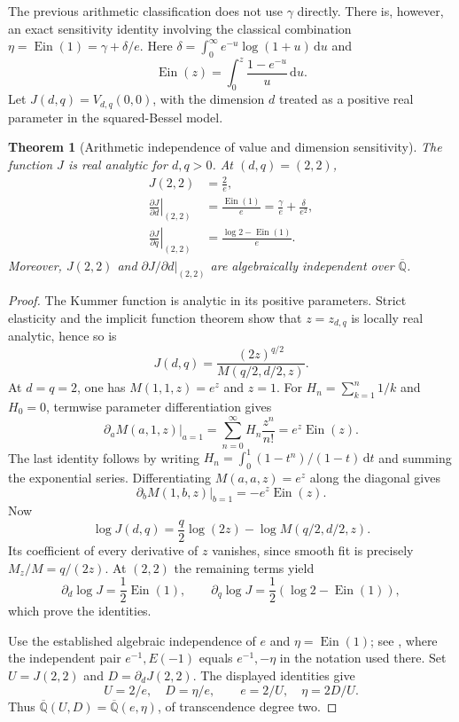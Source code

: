 \documentclass[11pt,a4paper]{article}
\newtheorem{theorem}{Theorem}[section]
\theoremstyle{definition}
\theoremstyle{remark}
\numberwithin{equation}{section}
\begin{document}
The previous arithmetic classification does not use $\gamma$ directly.
There is, however, an exact sensitivity identity involving the classical
combination $\eta=\operatorname{Ein}(1)=\gamma+\delta/e$.
Here $\delta=\int_0^\infty e^{-u}\log(1+u)\,\mathrm du$ and
\[
 \operatorname{Ein}(z)=\int_0^z\frac{1-e^{-u}}{u}\,\mathrm du.
\]
Let $J(d,q)=V_{d,q}(0,0)$, with the dimension $d$ treated as a positive
real parameter in the squared-Bessel model.

\begin{theorem}[Arithmetic independence of value and dimension sensitivity]
\label{p1:thm:value-dimension-sensitivity}
The function $J$ is real analytic for $d,q>0$. At $(d,q)=(2,2)$,
\begin{align*}
 J(2,2)&=\frac2e,\\
 \left.\frac{\partial J}{\partial d}\right|_{(2,2)}
 &=\frac{\operatorname{Ein}(1)}e
   =\frac\gamma e+\frac\delta{e^2},\\
 \left.\frac{\partial J}{\partial q}\right|_{(2,2)}
 &=\frac{\log2-\operatorname{Ein}(1)}e.
\end{align*}
Moreover, $J(2,2)$ and
$\left.\partial J/\partial d\right|_{(2,2)}$ are algebraically independent
over $\overline{\mathbb Q}$.
\end{theorem}
\begin{proof}
The Kummer function is analytic in its positive parameters. Strict
elasticity and the implicit function theorem show that $z=z_{d,q}$
is locally real analytic, hence so is
\[
 J(d,q)=\frac{(2z)^{q/2}}{M(q/2,d/2,z)}.
\]
At $d=q=2$, one has $M(1,1,z)=e^z$ and $z=1$.
For $H_n=\sum_{k=1}^n1/k$ and $H_0=0$, termwise parameter
differentiation gives
\[
 \left.\partial_aM(a,1,z)\right|_{a=1}
 =\sum_{n=0}^\infty H_n\frac{z^n}{n!}
 =e^z\operatorname{Ein}(z).
\]
The last identity follows by writing
$H_n=\int_0^1(1-t^n)/(1-t)\,\mathrm dt$ and summing the exponential
series. Differentiating $M(a,a,z)=e^z$ along the diagonal gives
\[
 \left.\partial_bM(1,b,z)\right|_{b=1}
 =-e^z\operatorname{Ein}(z).
\]
Now
\[
 \log J(d,q)=\frac q2\log(2z)-\log M(q/2,d/2,z).
\]
Its coefficient of every derivative of $z$ vanishes, since smooth fit
is precisely $M_z/M=q/(2z)$. At $(2,2)$ the remaining terms yield
\[
 \partial_d\log J=\frac12\operatorname{Ein}(1),\qquad
 \partial_q\log J=\frac12(\log2-\operatorname{Ein}(1)),
\]
which prove the identities.

Use the established algebraic independence of $e$ and
$\eta=\operatorname{Ein}(1)$; see
\cite[Section~5(ii)]{p1:Rivoal2012}, where the independent pair
$e^{-1},E(-1)$ equals $e^{-1},-\eta$ in the notation used there. Set $U=J(2,2)$ and
$D=\partial_dJ(2,2)$. The displayed identities give
\[
 U=2/e,\quad D=\eta/e,\qquad e=2/U,\quad\eta=2D/U.
\]
Thus $\overline{\mathbb Q}(U,D)=
\overline{\mathbb Q}(e,\eta)$, of transcendence degree two.
\end{proof}
\end{document}
